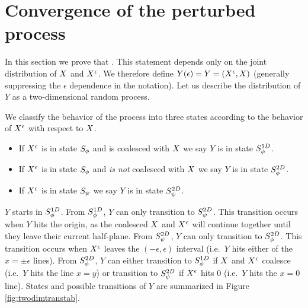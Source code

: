 {
\section{Convergence of the perturbed process}
\label{sec:proof-of-lem:resamplede-to-sampled}

\newcommand{\statenoweb}{S^{2D}_{\indepbm}}
\newcommand{\statewebapart}{S^{2D}_{\webnoargs}}
\newcommand{\statewebtogether}{S^{1D}_{\webnoargs}}
\newcommand{\twodim}{Y}

\newcommand{\twodime}{\twodim(\epsilon)}

In this section we prove that
\statementoflemresampledetosampled{}.  This statement depends only on the
joint distribution of $X$ and $X^{\epsilon}$.
We therefore define $\twodime = \twodim=(\resamplede, \sampled)$ (generally suppressing
the $\epsilon$ dependence in the notation). Let us describe the distribution of
$\twodim$
 as a two-dimensional random process.

We classify the behavior of the process into three states according to
the behavior of $X^{\epsilon}$ with respect to $X$.
\begin{itemize}
\item If $X^{\epsilon}$ is in state $S_{\phi}$
and is coalesced with $X$ we say $\twodim$ is in
state $\statewebtogether$.
\item If $X^{\epsilon}$ is in state $S_{\phi}$
and \emph{is not} coalesced with $X$ we say $\twodim$ is in state $\statewebapart$.
\item If $X^{\epsilon}$ is in state $S_{\psi}$
we say $\twodim$ is in state $\statenoweb$.
\end{itemize}
$\twodim$ starts
in $\statewebtogether$.  From $\statewebtogether$, $\twodim$
can only transition to $\statenoweb$.
This transition occurs when $\twodim$ hits the origin, as the coalesced
$X$ and $X^{\epsilon}$ will continue together until they leave their
current half-plane.
From $\statenoweb$, $\twodim$ can only transition to
$\statewebapart$.  This transition occurs when $X^{\epsilon}$
leaves the $(-\epsilon,\epsilon)$
interval (i.e.\ $\twodim$ hits either of the $x=\pm\epsilon$ lines).
From
$\statewebapart$, $\twodim$ can either transition to $\statewebtogether$
if $X$ and $X^{\epsilon}$ coalesce (i.e.\ $\twodim$ hits the line $x=y$)
or transition to $\statenoweb$ if $X^{\epsilon}$ hits $0$ (i.e.\ $\twodim$ hits
the $x=0$ line).
States and possible transitions of $\twodim$ are summarized in Figure
\ref{fig:twodimtranstab}.

}
